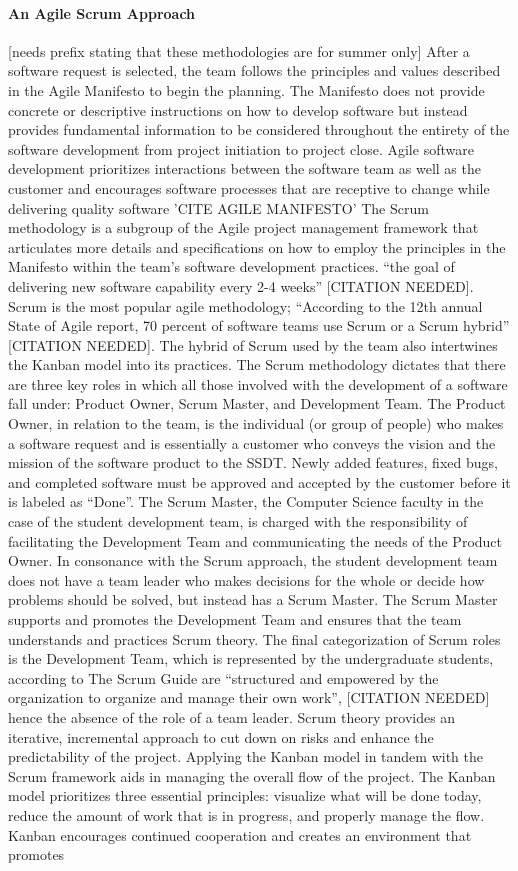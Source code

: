 \paragraph{An Agile Scrum Approach} [needs prefix stating that these methodologies are for summer only]
After a software request is selected, the team follows the principles and values described in the Agile Manifesto to begin the planning. The Manifesto does not provide concrete or descriptive instructions on how to develop software but instead provides fundamental information to be considered throughout the entirety of the software development from project initiation to project close. Agile software development prioritizes interactions between the software team as well as the customer and encourages software processes that are receptive to change while delivering quality software 'CITE AGILE MANIFESTO' The Scrum methodology is a subgroup of the Agile project management framework that articulates more details and specifications on how to employ the principles in the Manifesto within the team's software development practices.  ``the goal of delivering new software capability every 2-4 weeks'' [CITATION NEEDED]. Scrum is the most popular agile methodology; ``According to the 12th annual State of Agile report, 70 percent of software teams use Scrum or a Scrum hybrid'' [CITATION NEEDED]. The hybrid of Scrum used by the team also intertwines the Kanban model into its practices. The Scrum methodology dictates that there are three key roles in which all those involved with the development of a software fall under: Product Owner, Scrum Master, and Development Team. The Product Owner, in relation to the team, is the individual (or group of people) who makes a software request and is essentially a customer who conveys the vision and the mission of the software product to the SSDT. Newly added features, fixed bugs, and completed software must be approved and accepted by the customer before it is labeled as ``Done''. The Scrum Master, the Computer Science faculty in the case of the student development team, is charged with the responsibility of facilitating the Development Team and communicating the needs of the Product Owner. In consonance with the Scrum approach, the student development team does not have a team leader who makes decisions for the whole or decide how problems should be solved, but instead has a Scrum Master. The Scrum Master supports and promotes the Development Team and ensures that the team understands and practices Scrum theory. The final categorization of Scrum roles is the Development Team, which is represented by the undergraduate students, according to The Scrum Guide are ``structured and empowered by the organization to organize and manage their own work'', [CITATION NEEDED] hence the absence of the role of a team leader. Scrum theory provides an iterative, incremental approach to cut down on risks and enhance the predictability of the project. Applying the Kanban model in tandem with the Scrum framework aids in managing the overall flow of the project. The Kanban model prioritizes three essential principles: visualize what will be done today,  reduce the amount of work that is in progress, and properly manage the flow. Kanban encourages continued cooperation and creates an environment that promotes 